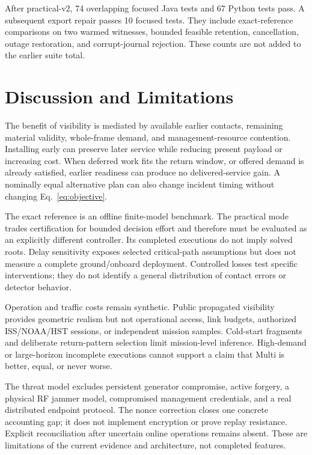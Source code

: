 \documentclass[conference]{IEEEtran}
\begin{document}
After practical-v2, 74 overlapping focused Java tests and 67 Python tests pass. A subsequent export repair passes 10 focused tests. They include exact-reference comparisons on two warmed witnesses, bounded feasible retention, cancellation, outage restoration, and corrupt-journal rejection. These counts are not added to the earlier suite total.

\section{Discussion and Limitations}
The benefit of visibility is mediated by available earlier contacts, remaining material validity, whole-frame demand, and management-resource contention. Installing early can preserve later service while reducing present payload or increasing cost. When deferred work fits the return window, or offered demand is already satisfied, earlier readiness can produce no delivered-service gain. A nominally equal alternative plan can also change incident timing without changing Eq.~\eqref{eq:objective}.

The exact reference is an offline finite-model benchmark. The practical mode trades certification for bounded decision effort and therefore must be evaluated as an explicitly different controller. Its completed executions do not imply solved roots. Delay sensitivity exposes selected critical-path assumptions but does not measure a complete ground/onboard deployment. Controlled losses test specific interventions; they do not identify a general distribution of contact errors or detector behavior.

Operation and traffic costs remain synthetic. Public propagated visibility provides geometric realism but not operational access, link budgets, authorized ISS/NOAA/HST sessions, or independent mission samples. Cold-start fragments and deliberate return-pattern selection limit mission-level inference. High-demand or large-horizon incomplete executions cannot support a claim that Multi is better, equal, or never worse.

The threat model excludes persistent generator compromise, active forgery, a physical RF jammer model, compromised management credentials, and a real distributed endpoint protocol. The nonce correction closes one concrete accounting gap; it does not implement encryption or prove replay resistance. Explicit reconciliation after uncertain online operations remains absent. These are limitations of the current evidence and architecture, not completed features.
\end{document}
